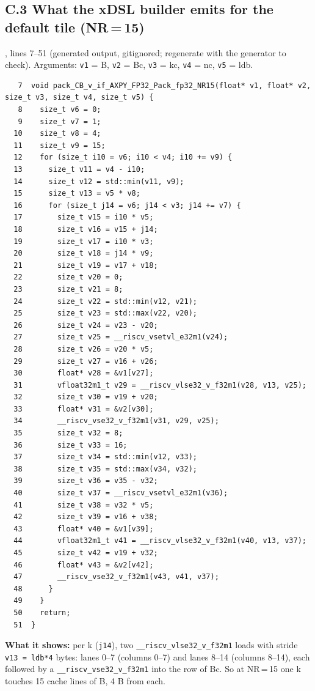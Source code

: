 \documentclass[10pt,a4paper]{article}
\begin{document}
\subsection*{C.3 What the xDSL builder emits for the default tile (NR\,=\,15)}
, lines 7--51 (generated output,
gitignored; regenerate with the generator to check). Arguments: \texttt{v1} = B, \texttt{v2} = Bc, \texttt{v3} = kc, \texttt{v4} = nc,
\texttt{v5} = ldb.
{\footnotesize\begin{verbatim}
   7  void pack_CB_v_if_AXPY_FP32_Pack_fp32_NR15(float* v1, float* v2, size_t v3, size_t v4, size_t v5) {
   8    size_t v6 = 0;
   9    size_t v7 = 1;
  10    size_t v8 = 4;
  11    size_t v9 = 15;
  12    for (size_t i10 = v6; i10 < v4; i10 += v9) {
  13      size_t v11 = v4 - i10;
  14      size_t v12 = std::min(v11, v9);
  15      size_t v13 = v5 * v8;
  16      for (size_t j14 = v6; j14 < v3; j14 += v7) {
  17        size_t v15 = i10 * v5;
  18        size_t v16 = v15 + j14;
  19        size_t v17 = i10 * v3;
  20        size_t v18 = j14 * v9;
  21        size_t v19 = v17 + v18;
  22        size_t v20 = 0;
  23        size_t v21 = 8;
  24        size_t v22 = std::min(v12, v21);
  25        size_t v23 = std::max(v22, v20);
  26        size_t v24 = v23 - v20;
  27        size_t v25 = __riscv_vsetvl_e32m1(v24);
  28        size_t v26 = v20 * v5;
  29        size_t v27 = v16 + v26;
  30        float* v28 = &v1[v27];
  31        vfloat32m1_t v29 = __riscv_vlse32_v_f32m1(v28, v13, v25);
  32        size_t v30 = v19 + v20;
  33        float* v31 = &v2[v30];
  34        __riscv_vse32_v_f32m1(v31, v29, v25);
  35        size_t v32 = 8;
  36        size_t v33 = 16;
  37        size_t v34 = std::min(v12, v33);
  38        size_t v35 = std::max(v34, v32);
  39        size_t v36 = v35 - v32;
  40        size_t v37 = __riscv_vsetvl_e32m1(v36);
  41        size_t v38 = v32 * v5;
  42        size_t v39 = v16 + v38;
  43        float* v40 = &v1[v39];
  44        vfloat32m1_t v41 = __riscv_vlse32_v_f32m1(v40, v13, v37);
  45        size_t v42 = v19 + v32;
  46        float* v43 = &v2[v42];
  47        __riscv_vse32_v_f32m1(v43, v41, v37);
  48      }
  49    }
  50    return;
  51  }
\end{verbatim}}

\textbf{What it shows:} per k (\texttt{j14}), two \texttt{\_\_riscv\_vlse32\_v\_f32m1} loads with stride \texttt{v13 = ldb*4} bytes:
lanes 0--7 (columns 0--7) and lanes 8--14 (columns 8--14), each followed by a \texttt{\_\_riscv\_vse32\_v\_f32m1} into the row of Bc.
So at NR\,=\,15 one k touches 15 cache lines of B, 4 B from each.
\end{document}
